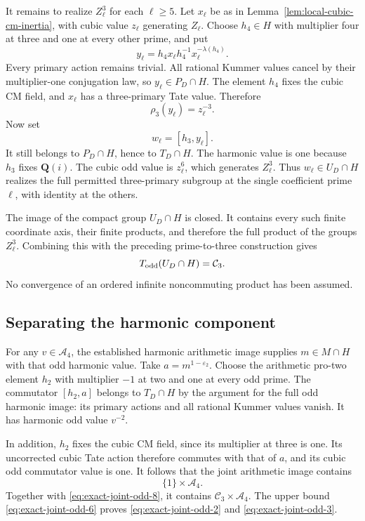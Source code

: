 It remains to realize \(Z_\ell^3\) for each \(\ell\ge5\).
Let \(x_\ell\) be as in
Lemma~\ref{lem:local-cubic-cm-inertia}, with cubic value
\(z_\ell\) generating \(Z_\ell\).
Choose \(h_4\in H\) with multiplier four at three and one
at every other prime, and put
\[
 y_\ell=h_4x_\ell h_4^{-1}x_\ell^{-\lambda(h_4)}.
\]
Every primary action remains trivial.
All rational Kummer values cancel by their multiplier-one
conjugation law, so \(y_\ell\in P_D\cap H\).
The element \(h_4\) fixes the cubic CM field, and \(x_\ell\)
has a three-primary Tate value. Therefore
\[
                       \rho_3(y_\ell)=z_\ell^{-3}.
\]
Now set
\[
                            w_\ell=[h_3,y_\ell].
\]
It still belongs to \(P_D\cap H\), hence to \(T_D\cap H\).
The harmonic value is one because \(h_3\) fixes
\(\mathbf Q(i)\).
The cubic odd value is \(z_\ell^6\), which generates
\(Z_\ell^3\). Thus \(w_\ell\in U_D\cap H\) realizes the
full permitted three-primary subgroup at the single
coefficient prime \(\ell\), with identity at the others.

The image of the compact group \(U_D\cap H\) is closed.
It contains every such finite coordinate axis, their
finite products, and therefore the full product of the
groups \(Z_\ell^3\). Combining this with the preceding
prime-to-three construction gives
\begin{equation}\label{eq:exact-joint-odd-8}
T_{\rm odd}(U_D\cap H)=\mathcal C_3.
\end{equation}
No convergence of an ordered infinite noncommuting product
has been assumed.

\subsection{Separating the harmonic component}

For any \(v\in\mathcal A_4\), the established harmonic
arithmetic image supplies \(m\in M\cap H\) with that odd
harmonic value.
Take \(a=m^{1-\varepsilon_2}\).
Choose the arithmetic pro-two element \(h_2\) with
multiplier \(-1\) at two and one at every odd prime.
The commutator \([h_2,a]\) belongs to \(T_D\cap H\) by
the argument for the full odd harmonic image:
its primary actions and all rational Kummer values vanish.
It has harmonic odd value \(v^{-2}\).

In addition, \(h_2\) fixes the cubic CM field, since its
multiplier at three is one.
Its uncorrected cubic Tate action therefore commutes with that
of \(a\), and its cubic odd commutator value is one.
It follows that the joint arithmetic image contains
\[
                         \{1\}\times\mathcal A_4.
\]
Together with \eqref{eq:exact-joint-odd-8}, it contains
\(\mathcal C_3\times\mathcal A_4\).
The upper bound \eqref{eq:exact-joint-odd-6} proves \eqref{eq:exact-joint-odd-2} and \eqref{eq:exact-joint-odd-3}.

